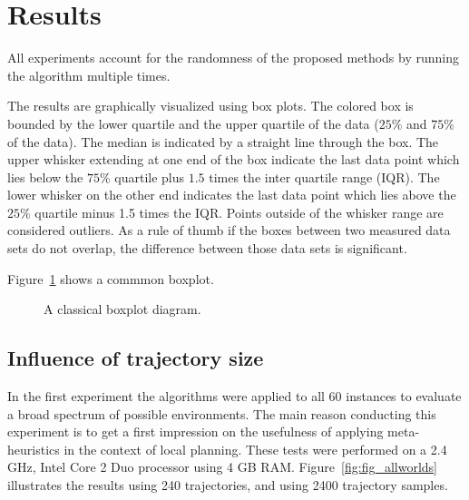 \section{Results}\label{sec:testresults}

All experiments account for the randomness of the proposed methods by running the algorithm multiple times.

The results are graphically visualized using box plots. 
The colored box is bounded by the lower quartile and the upper quartile of the data ($25\%$ and $75\%$ of the data). 
The median is indicated by a straight line through the box. 
The upper whisker extending at one end of the box indicate the last data point which lies below the $75\%$ quartile plus $1.5$ times the
inter quartile range (IQR). The lower whisker on the other end indicates the last data point which lies above the $25\%$ quartile minus 1.5 times the IQR. 
Points outside of the whisker range are considered outliers.
As a rule of thumb if the boxes between two measured data sets do not overlap, the difference between those data sets is significant.

Figure~\ref{fig:fig_boxplot} shows a commmon boxplot. 
\begin{figure}[thpb]
     \footnotesize
      \centering
      \myfloatalign
      \setlength\fboxsep{0pt}
      \setlength\fboxrule{0.5pt}
       \caption{A classical boxplot diagram.}
      \label{fig:fig_boxplot}
   \end{figure}

\subsection{Influence of trajectory size}
In the first experiment the algorithms were applied to all 60 instances to evaluate a broad spectrum of possible environments. 
The main reason conducting this experiment is to get a first impression on the usefulness of applying meta-heuristics in the context of local planning. 
These tests were performed on a 2.4 GHz, Intel Core 2 Duo processor using 4 GB RAM.  
Figure~\ref{fig:fig_allworlds} illustrates the results using 240 trajectories, and using 2400 trajectory samples.

